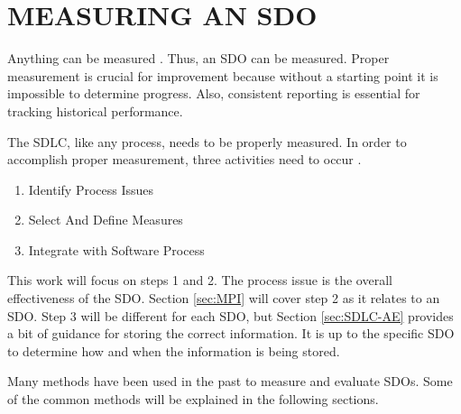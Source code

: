 \documentclass[SDSUThesis.tex]{subfiles}
\begin{document}
\section{MEASURING AN SDO}

    Anything can be measured \cite{Hubbard2010}.  Thus, an SDO can be 
    measured.  Proper measurement is crucial for improvement because
    without a starting point it is impossible to determine progress.
    Also, consistent reporting is essential for 
    tracking historical performance.  
    
    The SDLC, like any process, needs to be properly measured.  In
    order to accomplish proper measurement, three activities need
    to occur \cite{florac1999}.  
    
    \begin{enumerate}
        \item Identify Process Issues
        \item Select And Define Measures
        \item Integrate with Software Process
    \end{enumerate}
    
    This work will focus on steps 1 and 2.  The process issue is the overall
    effectiveness of the SDO.  Section \ref{sec:MPI} will cover step 2 as
    it relates to an SDO.  Step
    3 will be different for each SDO, but Section \ref{sec:SDLC-AE} provides
    a bit of guidance for storing the correct information.  It is up to the
    specific SDO to determine how and when the information is being stored.

    Many methods have been  used in the past 
    to measure and evaluate SDOs.  Some of the common methods
    will be explained in the following sections. 
\end{document}
